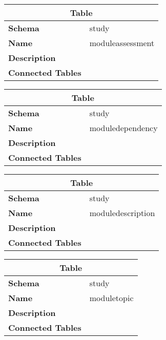 \begin{table}[H]
	\renewcommand{\arraystretch}{2}
	\centering
	\begin{tabular}{|p{}|p{}|}
		\hline
		\multicolumn{2}{|c|}{\textbf{Table}} \\ \hline
		\textbf{Schema}               & study \\ \hline
		\textbf{Name}                 & moduleassessment \\ \hline
		\textbf{Description}          &      \\ \hline
		\textbf{Connected Tables}     &      \\ \hline
	\end{tabular}
\end{table}

\begin{table}[H]
	\renewcommand{\arraystretch}{2}
	\centering
	\begin{tabular}{|p{}|p{}|}
		\hline
		\multicolumn{2}{|c|}{\textbf{Table}} \\ \hline
		\textbf{Schema}               & study \\ \hline
		\textbf{Name}                 & moduledependency \\ \hline
		\textbf{Description}          &      \\ \hline
		\textbf{Connected Tables}     &      \\ \hline
	\end{tabular}
\end{table}

\begin{table}[H]
	\renewcommand{\arraystretch}{2}
	\centering
	\begin{tabular}{|p{}|p{}|}
		\hline
		\multicolumn{2}{|c|}{\textbf{Table}} \\ \hline
		\textbf{Schema}               & study \\ \hline
		\textbf{Name}                 & moduledescription \\ \hline
		\textbf{Description}          &      \\ \hline
		\textbf{Connected Tables}     &      \\ \hline
	\end{tabular}
\end{table}

\begin{table}[H]
	\renewcommand{\arraystretch}{2}
	\centering
	\begin{tabular}{|p{}|p{}|}
		\hline
		\multicolumn{2}{|c|}{\textbf{Table}} \\ \hline
		\textbf{Schema}               & study \\ \hline
		\textbf{Name}                 & moduletopic \\ \hline
		\textbf{Description}          &      \\ \hline
		\textbf{Connected Tables}     &      \\ \hline
	\end{tabular}
\end{table}

